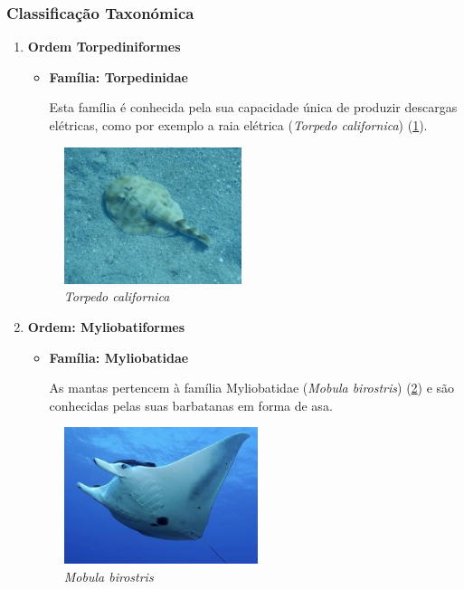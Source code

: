 \documentclass{report}
\begin{document}
\subsubsection{Classificação Taxonómica}
\begin{enumerate}
	\item \textbf{Ordem Torpediniformes}
	\begin{itemize}
		\item \textbf{Família: Torpedinidae}
		
Esta família é conhecida pela sua capacidade única de produzir descargas elétricas, como por exemplo a raia elétrica (\textit{Torpedo californica}) (\ref{fig:raiaeletrica}).
	\end{itemize}
	
	\begin{figure}[H]
	\center
        	\includegraphics[height=4cm]{imagens/raiaeletrica.jpg}
        	\caption{\textit{Torpedo californica}}
        	\label{fig:raiaeletrica}
	\end{figure}	


	\item \textbf{Ordem: Myliobatiformes}
	\begin{itemize}
		\item \textbf{Família: Myliobatidae}
		
As mantas pertencem à família Myliobatidae (\textit{Mobula birostris}) (\ref{fig:manta}) e são conhecidas pelas suas barbatanas em forma de asa.
	\end{itemize}
	
	\begin{figure}[H]
	\center
        	\includegraphics[height=4cm]{imagens/manta.jpg}
        	\caption{\textit{Mobula birostris}}
        	\label{fig:manta}
	\end{figure}
	

\end{enumerate}
\end{document}
